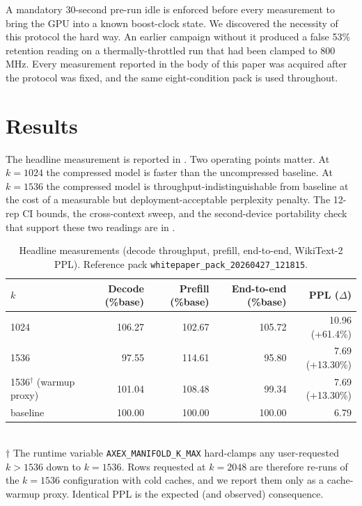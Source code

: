 \documentclass[11pt]{article}
\begin{document}
A mandatory 30-second pre-run idle is enforced before every measurement to
bring the GPU into a known boost-clock state. We discovered the necessity
of this protocol the hard way. An earlier campaign without it produced a
false 53\% retention reading on a thermally-throttled run that had been
clamped to 800\,MHz. Every measurement reported in the body of this paper
was acquired after the protocol was fixed, and the same eight-condition
pack is used throughout.
\FloatBarrier

\section{Results}
\label{sec:results}

The headline measurement is reported in . Two
operating points matter. At $k{=}1024$ the compressed model is faster than
the uncompressed baseline. At $k{=}1536$ the compressed model is
throughput-indistinguishable from baseline at the cost of a measurable but
deployment-acceptable perplexity penalty. The 12-rep CI bounds, the
cross-context sweep, and the second-device portability check that support
these two readings are in .

\begin{table}[h]\centering\small
\caption{Headline measurements (decode throughput, prefill, end-to-end,
WikiText-2 PPL).  Reference pack \texttt{whitepaper\_pack\_20260427\_121815}.}
\label{tab:headline}
\begin{tabular}{@{}lrrrr@{}}
\toprule
$k$ & Decode (\%base) & Prefill (\%base) & End-to-end (\%base) & PPL ($\Delta$) \\
\midrule
1024 & 106.27 & 102.67 & 105.72 & 10.96 (+61.4\%) \\
1536 & 97.55 & 114.61 & 95.80  & 7.69 (+13.30\%) \\
1536$^\dagger$ (warmup proxy) & 101.04 & 108.48 & 99.34 & 7.69 (+13.30\%) \\
\midrule
baseline & 100.00 & 100.00 & 100.00 & 6.79 \\
\bottomrule
\end{tabular}
\medskip\\
{\footnotesize $\dagger$ The runtime variable
\texttt{AXEX\_MANIFOLD\_K\_MAX} hard-clamps any user-requested $k>1536$
down to $k{=}1536$.  Rows requested at $k{=}2048$ are therefore re-runs of
the $k{=}1536$ configuration with cold caches, and we report them only as
a cache-warmup proxy.  Identical PPL is the expected (and observed)
consequence.}
\end{table}
\end{document}
